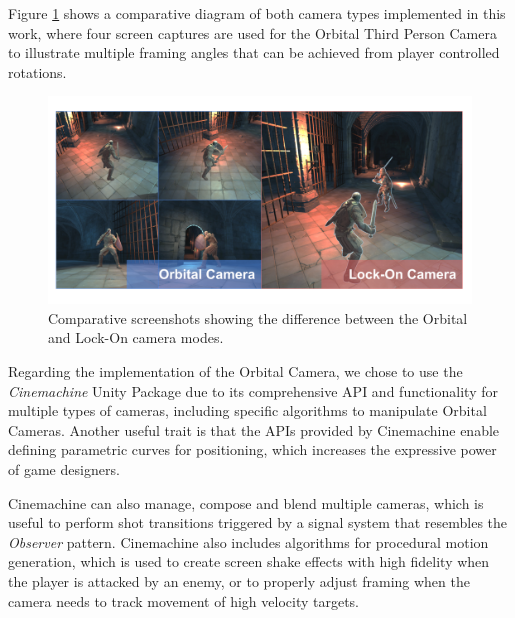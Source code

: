 Figure \ref{fig:camera-types} shows a comparative diagram of both camera types implemented in this work, where four screen captures are used for the Orbital Third Person Camera to illustrate multiple framing angles that can be achieved from player controlled rotations.

\begin{figure}[!ht]
    \caption{Comparative screenshots showing the difference between the Orbital and Lock-On camera modes.}
    \vspace{0.5em}
    \begin{center}
        \includegraphics[width=34em]{figures/fig-camera-types.png}
    \end{center}
    \label{fig:camera-types}
\end{figure}

Regarding the implementation of the Orbital Camera, we chose to use the \emph{Cinemachine} Unity Package due to its comprehensive API and functionality for multiple types of cameras, including specific algorithms to manipulate Orbital Cameras. Another useful trait is that the APIs provided by Cinemachine enable defining parametric curves for positioning, which increases the expressive power of game designers.

Cinemachine can also manage, compose and blend multiple cameras, which is useful to perform shot transitions triggered by a signal system that resembles the \emph{Observer} pattern. Cinemachine also includes algorithms for procedural motion generation, which is used to create screen shake effects with high fidelity when the player is attacked by an enemy, or to properly adjust framing when the camera needs to track movement of high velocity targets.

